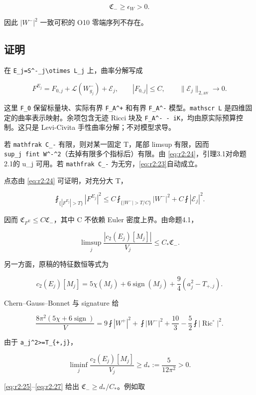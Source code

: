 \documentclass[UTF8,11pt,fontset=none]{ctexart}
\begin{document}
\[
 \boxed{\mathfrak C_-\ge\epsilon_W>0.}
 \tag{2.23}\label{eq:r2:23}
\]

因此 \(|W^-|^2\) 一致可积的 O10 零端序列不存在。

\subsection{证明}\label{ch2:ux8bc1ux660e-3}

在 \texttt{E\_j=S\^{}-\_j\textbackslash{}otimes\ L\_j} 上，曲率分解写成

\[
 F^{E_j}=F_{0,j}+\mathscr L(W^-_{g_j})+\mathcal E_j,
 \qquad |F_{0,j}|\le C,
 \qquad\|\mathcal E_j\|_{2,\mathrm{av}}\to0.
 \tag{2.24}\label{eq:r2:24}
\]

这里 \texttt{F\_0} 保留标量块、实际有界 \texttt{F\_A\^{}+} 和有界 \texttt{F\_A\^{}-} 模型。\texttt{mathscr\ L} 是四维固定的曲率表示映射。余项包含无迹 Ricci 块及 \texttt{F\_A\^{}-\ -\ iK}，均由原实际预算控制。这只是 Levi-Civita 手性曲率分解；不对模型求导。

若 \texttt{mathfrak\ C\_-} 有限，则对某一固定 T，尾部 limsup 有限，因而 \texttt{sup\_j\ fint\ \textbar{}W\^{}-\textbar{}\^{}2}（去掉有限多个指标后）有限。由 \eqref{eq:r2:24}，引理3.1对命题2.1的 u\_j 可用。若 \texttt{mathfrak\ C\_-} 为无穷，\eqref{eq:r2:23}自动成立。

点态由 \eqref{eq:r2:24} 可证明，对充分大 T，

\[
 \fint_{\{|F^{E_j}|>T\}}|F^{E_j}|^2
 \le C\fint_{\{|W^-|>T/C\}}|W^-|^2
       +C\fint|\mathcal E_j|^2.
\]

因而 \(\mathfrak C_{F^E}\le C\mathfrak C_-\)，其中 C 不依赖 Euler 密度上界。由命题4.1，

\[
 \limsup_j\frac{|c_2(E_j)[M_j]|}{V_j}
 \le C_*\mathfrak C_-.
 \tag{2.25}\label{eq:r2:25}
\]

另一方面，原稿的特征数恒等式为

\[
 c_2(E_j)[M_j]
 =5\chi(M_j)+6\operatorname{sign}(M_j)
 +\frac94(a_j^2-T_{+,j}).
 \tag{2.26}\label{eq:r2:26}
\]

Chern--Gauss--Bonnet 与 signature 给

\[
 \frac{8\pi^2(5\chi+6\operatorname{sign})}{V}
 =9\fint|W^+|^2+\fint|W^-|^2
       +\frac{10}{3}-\frac52\fint|\operatorname{Ric}^\circ|^2.
\]

由于 \texttt{a\_j\^{}2\textgreater{}=T\_\{+,j\}}，

\[
 \liminf_j\frac{c_2(E_j)[M_j]}{V_j}
 \ge d_*:=\frac{5}{12\pi^2}>0.
 \tag{2.27}\label{eq:r2:27}
\]

\eqref{eq:r2:25}--\eqref{eq:r2:27} 给出 \(\mathfrak C_-\ge d_*/C_*\)。例如取
\end{document}
